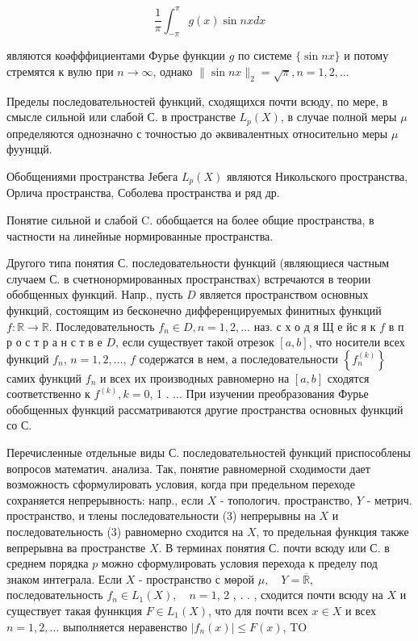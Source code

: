 \documentclass[10pt]{article}
\begin{document}
\[

\frac{1}{\pi} \int_{-\pi}^{\pi} g(x) \sin n x d x

\]



являются коәфффициентами Фурье функции $g$ по системе $\{\sin n x\}$ и потому стремятся к вулю при $n \rightarrow \infty$, однако $\|\sin n x\|_{2}=\sqrt{\pi}, n=1,2, \ldots$



Пределы последовательностей функций, сходящихся почти всюду, по мере, в смысле сильной или слабой С. в пространстве $L_{p}(X)$, в случае полной меры $\mu$ определяются однозначно с точностью до әквивалентных относительно меры $\mu$ фуунццй.



Обобщениями пространства Јебега $L_{p}(X)$ являются Никольского пространства, Орлича пространства, Соболева пространства и ряд др.



Понятие сильной и слабой C. обобщается на более общие пространства, в частности на линейные нормированные пространства.



Другого типа понятия С. последовательности функций (являющиеся частным случаем С. в счетнонормированных пространствах) встречаются в теории обобщенных функций. Напр., пусть $D$ является пространством основных функций, состоящим из бесконечно дифференцируемых финитных функций $f: \mathbb{R} \rightarrow \mathbb{R}$. Последовательность $f_{n} \in D, n=1,2, \ldots$ наз. с х о д я Щ е йс я к $f$ в п р о с т р а н с т в е $D$, если существует такой отрезок $[a, b]$, что носители всех функций $f_{n}$, $n=1,2, \ldots$, $f$ содержатся в нем, а последовательности $\left\{f_{n}^{(k)}\right\}$ самих функций $f_{n}$ и всех их производных равномерно на $[a, b]$ сходятся соответственно к $f^{(k)}, k=0$, 1 . ... При изучении преобразования Фурье обобщенных функций рассматриваются другие пространства основных функций со С.



Перечисленные отдельные виды С. последовательностей функций приспособлены вопросов математич. анализа. Так, понятие равномерной сходимости дает возможность сформулировать условия, когда при предельном переходе сохраняется непрерывность: напр., если $X$ - топологич. пространство, $Y$ - метрич. пространство, и тлены последовательности (3) непрерывны на $X$ и последовательность (3) равномерно сходится на $X$, то предельная функция также вепрерывна ва пространстве $X$. В терминах понятия С. почти всюду или С. в среднем порядка $p$ можно сформулировать условия перехода к пределу под знаком интеграла. Если $X$ - пространство с мөрой $\mu, \quad Y=\overline{\mathbb{R}}, \quad$ последовательность $f_{n} \in L_{1}(X), \quad n=1$, 2 , . . , сходится почти всюду на $X$ и существует такая фуннкция $F \in L_{1}(X)$, что для почти всех $x \in X$ и всех $n=1,2, \ldots$ выполняется неравенство $\left|f_{n}(x)\right| \leqslant F(x)$, TO
\end{document}
